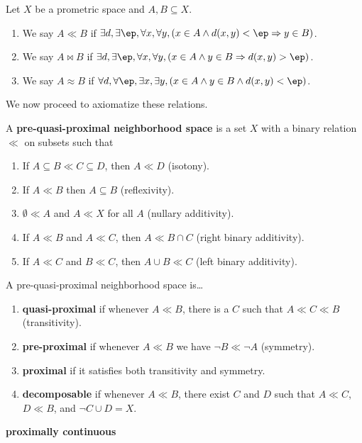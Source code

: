 \documentclass{article}
\def\cpl#1{\neg #1}
\let\implies\Rightarrow
\begin{document}
\begin{defn}
  Let $X$ be a prometric space and $A,B\subseteq X$.
  \begin{enumerate}
  \item We say $A\ll B$ if $\exists d, \exists \ep, \forall x, \forall y, (x\in A \land d(x,y)<\ep \implies y\in B)$.
  \item We say $A\bowtie B$ if $\exists d, \exists \ep, \forall x, \forall y, (x\in A \land y\in B \implies d(x,y)>\ep)$.
  \item We say $A\approx B$ if $\forall d, \forall \ep, \exists x, \exists y, (x\in A \land y\in B \land d(x,y)<\ep)$.
  \end{enumerate}
\end{defn}

We now proceed to axiomatize these relations.

\begin{defn}
  A \textbf{pre-quasi-proximal neighborhood space} is a set $X$ with a binary relation $\ll$ on subsets such that
  \begin{enumerate}
  \item If $A \subseteq B \ll C \subseteq D$, then $A\ll D$ (isotony).
  \item If $A\ll B$ then $A\subseteq B$ (reflexivity).
  \item $\emptyset \ll A$ and $A\ll X$ for all $A$ (nullary additivity).
  \item If $A\ll B$ and $A\ll C$, then $A\ll B\cap C$ (right binary additivity).
  \item If $A\ll C$ and $B\ll C$, then $A\cup B \ll C$ (left binary additivity).
  \end{enumerate}
  A pre-quasi-proximal neighborhood space is\dots
  \begin{enumerate}[resume]
  \item \textbf{quasi-proximal} if whenever $A\ll B$, there is a $C$ such that $A\ll C \ll B$ (transitivity).
  \item \textbf{pre-proximal} if whenever $A\ll B$ we have $\cpl{B} \ll \cpl{A}$ (symmetry).
  \item \textbf{proximal} if it satisfies both transitivity and symmetry.
  \item \textbf{decomposable} if whenever $A\ll B$, there exist $C$ and $D$ such that $A\ll C$, $D\ll B$, and $\cpl{C}\cup D = X$.
  \end{enumerate}
  \textbf{proximally continuous}
\end{defn}
\end{document}
